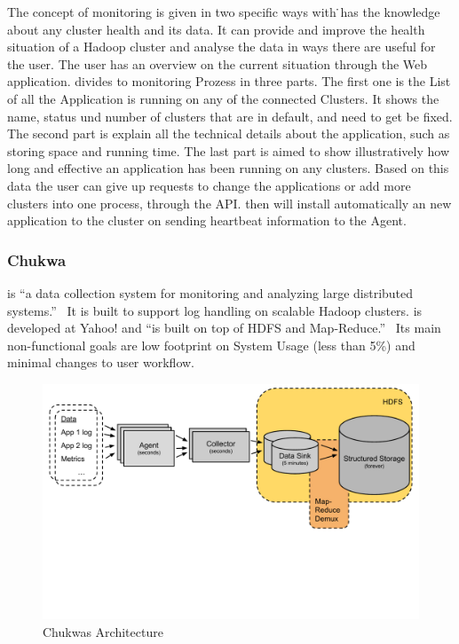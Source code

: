 The concept of monitoring is given in two specific ways with \amb\. \amb has the knowledge about any cluster health and its data. It can provide and improve the health situation of a Hadoop cluster and analyse the data in ways there are useful for the user. The user has an overview on the current situation through the Web application. \amb divides to monitoring Prozess in three parts. The first one is the List of all the Application \amb is running on any of the connected Clusters. It shows the name, status und number of clusters that are in default, and need to get be fixed. The second part is explain all the technical details about the application, such as storing space and running time. The last part is aimed to show illustratively how long and effective an application has been running on any clusters. Based on this data the user can give up requests to change the applications or add more clusters into one process, through the API. \amb then will install automatically an new application to the cluster on sending heartbeat information to the \amb Agent. 

\subsubsection{Chukwa}
\chuklong is ``a data collection system for monitoring and analyzing large distributed systems.''~\cite{Boulona}
It is built to support log handling on scalable Hadoop clusters. \chuk is developed at Yahoo! and ``is built on top of HDFS and Map-Reduce.''~\cite{Rabkin2008a}
Its main non-functional goals are low footprint on System Usage (less than 5\%) and minimal changes to user workflow.~\cite{Rabkin2010}


\begin{figure}[hbt]
  \centering
  \includegraphics[width=\linewidth,clip=true,trim=0 6cm 0 0]{images/ChukwaArchitecture}
  \caption{Chukwas Architecture~\cite{Rabkin2008}}
  \label{fig:ChukwaArchitecture}
\end{figure}
